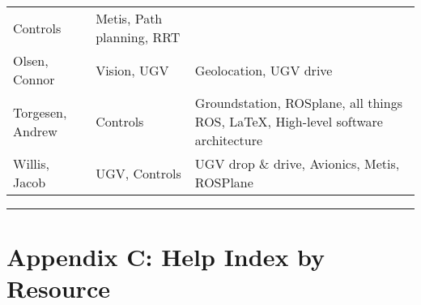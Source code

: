 \begin{longtable}[]{@{}lll@{}}
\begin{minipage}[t]{0.30\columnwidth}
{Controls}\strut
\end{minipage} & \begin{minipage}[t]{0.30\columnwidth}\raggedright\strut
{Metis, Path planning, RRT}\strut
\end{minipage}\tabularnewline
\begin{minipage}[t]{0.30\columnwidth}\raggedright\strut
{Olsen, Connor}\strut
\end{minipage} & \begin{minipage}[t]{0.30\columnwidth}\raggedright\strut
{Vision, UGV}\strut
\end{minipage} & \begin{minipage}[t]{0.30\columnwidth}\raggedright\strut
{Geolocation, UGV drive}\strut
\end{minipage}\tabularnewline
\begin{minipage}[t]{0.30\columnwidth}\raggedright\strut
{Torgesen, Andrew}\strut
\end{minipage} & \begin{minipage}[t]{0.30\columnwidth}\raggedright\strut
{Controls}\strut
\end{minipage} & \begin{minipage}[t]{0.30\columnwidth}\raggedright\strut
{Groundstation, ROSplane, all things ROS, LaTeX, High-level software
architecture}\strut
\end{minipage}\tabularnewline
\begin{minipage}[t]{0.30\columnwidth}\raggedright\strut
{Willis, Jacob}\strut
\end{minipage} & \begin{minipage}[t]{0.30\columnwidth}\raggedright\strut
{UGV, Controls}\strut
\end{minipage} & \begin{minipage}[t]{0.30\columnwidth}\raggedright\strut
{UGV drop \& drive, Avionics, Metis, ROSPlane}\strut
\end{minipage}\tabularnewline
\bottomrule
\end{longtable}

{}

\begin{center}\rule{0.5\linewidth}{\linethickness}\end{center}

\section{\texorpdfstring{{}}{}}\label{h.o5ta65afm3b2}

\hypertarget{h.45veev2p372u}{\section{\texorpdfstring{{Appendix C: Help
Index by
Resource}}{Appendix C: Help Index by Resource}}\label{h.45veev2p372u}}

